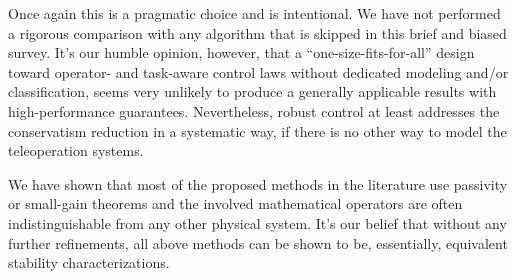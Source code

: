 Once again this is a pragmatic choice and is intentional. We have not performed a rigorous comparison with any algorithm that is 
skipped in this brief and biased survey. It's our humble opinion, however, that a ``one-size-fits-for-all'' design 
toward operator- and task-aware control laws without dedicated modeling and/or classification, seems very 
unlikely to produce a generally applicable results with high-performance guarantees. Nevertheless, robust 
control at least addresses the conservatism reduction in a systematic way, if there is no other way to model the 
teleoperation systems.


We have shown that most of the proposed methods in the literature use passivity or small-gain theorems  and 
the involved mathematical operators are often indistinguishable from any other physical system. It's our belief that
without any further refinements, all above methods can be shown to be, essentially, equivalent stability 
characterizations.